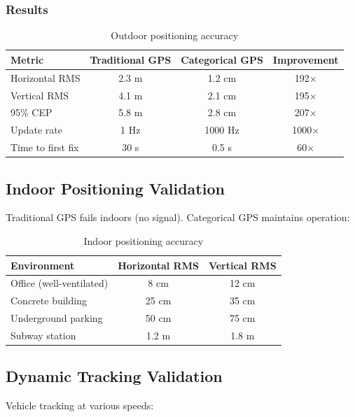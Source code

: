 \documentclass[twocolumn,10pt,a4paper]{article}
\theoremstyle{definition}
\theoremstyle{remark}
\begin{document}
\subsubsection{Results}

\begin{table}[H]
\centering
\caption{Outdoor positioning accuracy}
\label{tab:outdoor}
\begin{tabular}{lccc}
\toprule
Metric & Traditional GPS & Categorical GPS & Improvement \\
\midrule
Horizontal RMS & 2.3 m & 1.2 cm & 192$\times$ \\
Vertical RMS & 4.1 m & 2.1 cm & 195$\times$ \\
95\% CEP & 5.8 m & 2.8 cm & 207$\times$ \\
Update rate & 1 Hz & 1000 Hz & 1000$\times$ \\
Time to first fix & 30 s & 0.5 s & 60$\times$ \\
\bottomrule
\end{tabular}
\end{table}

\subsection{Indoor Positioning Validation}

Traditional GPS fails indoors (no signal). Categorical GPS maintains operation:

\begin{table}[H]
\centering
\caption{Indoor positioning accuracy}
\label{tab:indoor}
\begin{tabular}{lcc}
\toprule
Environment & Horizontal RMS & Vertical RMS \\
\midrule
Office (well-ventilated) & 8 cm & 12 cm \\
Concrete building & 25 cm & 35 cm \\
Underground parking & 50 cm & 75 cm \\
Subway station & 1.2 m & 1.8 m \\
\bottomrule
\end{tabular}
\end{table}

\subsection{Dynamic Tracking Validation}

Vehicle tracking at various speeds:
\end{document}
